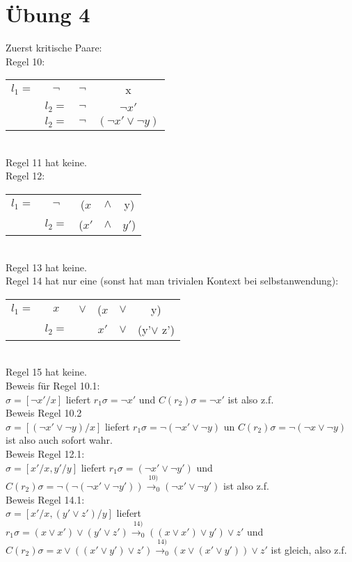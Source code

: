 \documentclass{article}
\begin{document}
	\section{Übung 4}
	Zuerst kritische Paare:\\
	Regel 10:\\
	\begin{tabular}{cccc}
	$l_1=$  & $\lnot$&$\lnot$ &x\\
	  &$l_2=$&$\lnot$ &$\lnot x'$\\
	  &$l_2=$&$\lnot$&$(\lnot x'\lor \lnot y)$\\
	\end{tabular}\\
	Regel 11 hat keine.\\
	Regel 12:\\
	\begin{tabular}{ccccc}
	$l_1=$ &$\lnot$ & ($x$&$\land$ &y)\\
		    &$l_2=$&($x'$ & $\land$ & $y'$)\\
	\end{tabular}\\
	Regel 13 hat keine.\\
	Regel 14 hat nur eine (sonst hat man trivialen Kontext bei selbstanwendung):\\
	\begin{tabular}{cccccc}
	$l_1=$ &$x$& $\lor$& ($x$&$\lor$ &y)\\
	 &$l_2=$& &$x'$& $\lor$&(y'$\lor$ z')\\
	\end{tabular}\\
	Regel 15 hat keine.\\
	Beweis für Regel 10.1:\\
	$\sigma = [\lnot x'/x]$ liefert $r_1\sigma = \lnot x'$ und $C(r_2)\sigma = \lnot x'$ ist also z.f.\\
	Beweis Regel 10.2\\
	$\sigma = [(\lnot x'\lor \lnot y)/x]$ liefert $r_1\sigma = \lnot (\lnot x'\lor \lnot y)$ un $C(r_2)\sigma = \lnot (\lnot x\lor\lnot y)$ ist also auch sofort wahr.\\
	Beweis Regel 12.1:\\
	$\sigma = [x'/x, y'/y]$ liefert $r_1\sigma = (\lnot x'\lor \lnot y')$ und $C(r_2)\sigma = \lnot(\lnot(\lnot x'\lor \lnot y'))\stackrel{10)}{\to_0} (\lnot x'\lor \lnot y')$ ist also z.f.\\
	Beweis Regel 14.1:\\
	$\sigma = [x'/x, (y'\lor z')/y]$ liefert $r_1\sigma = (x\lor x')\lor(y'\lor z')\stackrel{14)}{\to_0} ((x\lor x')\lor y')\lor z'$ und $C(r_2)\sigma = x\lor ((x'\lor y')\lor z')\stackrel{14)}{\to_0} (x\lor (x'\lor y'))\lor z'$ ist gleich, also z.f.\\
\end{document}
